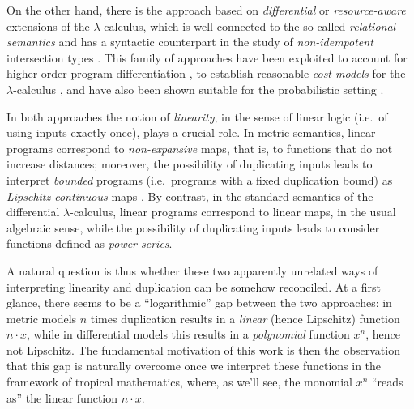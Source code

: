 On the other hand, there is the approach based on \emph{differential} \cite{difflambda} or \emph{resource-aware} \cite{Boudol1993} extensions of the $\lambda$-calculus, which is well-connected to the so-called \emph{relational semantics} \cite{Manzo2012, Manzo2013, dill} and has a syntactic counterpart in the study of \emph{non-idempotent} intersection types \cite{decarvalho2018, Mazza2016}. This family of approaches have been exploited to account for higher-order program differentiation \cite{difflambda}, to establish reasonable \emph{cost-models} for the $\lambda$-calculus \cite{Accattoli2021}, and have also been shown suitable for the probabilistic setting \cite{Manzo2013, Breuvart2018, PistoneLICS2022}. 


In both approaches the notion of \emph{linearity}, in the sense of linear logic \cite{girardLl} (i.e.~of using inputs exactly once), plays a crucial role.
In metric semantics, linear programs correspond to \emph{non-expansive} maps, that is, to functions that do not increase distances; moreover, the possibility of duplicating inputs leads to interpret \emph{bounded} programs (i.e.~programs with a fixed duplication bound) as \emph{Lipschitz-continuous} maps \cite{Gaboardi2017}.
By contrast, in the standard semantics of the differential $\lambda$-calculus, linear programs correspond to linear maps, in the usual algebraic sense, while the possibility of duplicating inputs leads to consider functions defined as \emph{power series}.


A natural question is thus whether these two apparently unrelated ways of interpreting linearity and duplication can be somehow reconciled. At a first glance, there seems to be a  ``logarithmic'' gap between the two approaches:
in metric models $n$ times duplication results in a \emph{linear} (hence Lipschitz) function $n\cdot x$, while in differential models this results in a \emph{polynomial} function $x^{n}$, hence not Lipschitz. The fundamental motivation of this work is then the observation that 
this gap is naturally overcome once we interpret these functions in the framework of tropical mathematics, where, as we'll see, the monomial $x^{n}$ ``reads as'' the linear function $n\cdot x$.

